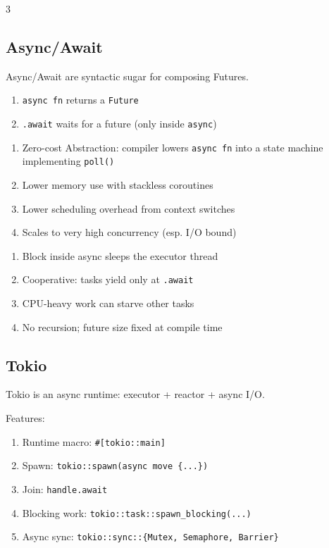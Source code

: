 \documentclass[12pt, a4paper]{article}
\begin{document}
\begin{multicols*}{3}
\subsection{Async/Await}
Async/Await are syntactic sugar for composing Futures.
\begin{enumerate}[\roman*.]
  \item \lstinline|async fn| returns a \lstinline|Future|
  \item \lstinline|.await| waits for a future (only inside \lstinline|async|)
\end{enumerate}
\begin{enumerate}[$+$]\vspace{-1pt}
  \item Zero-cost Abstraction: compiler lowers \lstinline|async fn| into a state machine implementing \lstinline|poll()|
  \item Lower memory use with stackless coroutines
  \item Lower scheduling overhead from context switches
  \item Scales to very high concurrency (esp. I/O bound)
\end{enumerate}
\begin{enumerate}[$-$]\vspace{-1pt}
  \item Block inside async sleeps the executor thread
  \item Cooperative: tasks yield only at \lstinline|.await|
  \item CPU-heavy work can starve other tasks 
  \item No recursion; future size fixed at compile time
\end{enumerate}
\vspace{-1em}
\colbreak

\subsection{Tokio}
Tokio is an async runtime: executor + reactor + async I/O.

Features:
\begin{enumerate}[\roman*.]
  \item Runtime macro: \lstinline|#[tokio::main]|
  \item Spawn: \lstinline|tokio::spawn(async move {...})|
  \item Join: \lstinline|handle.await|
  \item Blocking work: \lstinline|tokio::task::spawn_blocking(...)|
  \item Async sync: \lstinline|tokio::sync::{Mutex, Semaphore, Barrier}|
\end{enumerate}


\end{multicols*}
\end{document}
